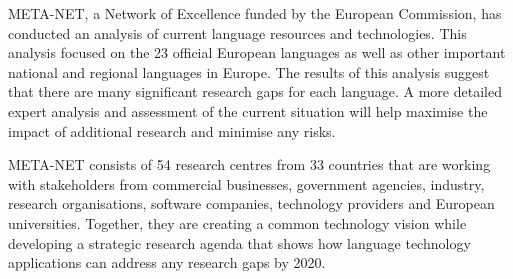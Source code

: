 \begin{Parallel}[c]{78mm}{78mm}
{META-NET, a Network of Excellence funded by the European Commission, has conducted an analysis of current language resources and technologies. This analysis focused on the 23 official European languages as well as other important national and regional languages in Europe. The results of this analysis suggest that there are many significant research gaps for each language. A more detailed expert analysis and assessment of the current situation will help maximise the impact of additional research and minimise any risks.

META-NET consists of 54 research centres from 33 countries that are working with stakeholders from commercial businesses, government agencies, industry, research organisations, software companies, technology providers and European universities. Together, they are creating a common technology vision while developing a strategic research agenda that shows how language technology applications can address any research gaps by 2020.} 
\ParallelPar
\end{Parallel}

\cleardoublepage


\renewcommand\contentsname{}

\tableofcontents
{}

\cleardoublepage


\setcounter{page}{1}
\pagestyle{scrheadings}




